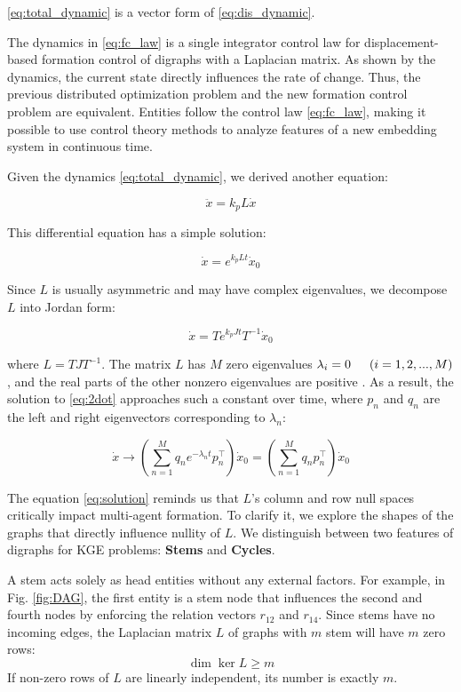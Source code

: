 \documentclass[letterpaper, 10 pt, conference]{ieeeconf}  %
\begin{document}
\noindent \eqref{eq:total_dynamic} is a vector form of \eqref{eq:dis_dynamic}.

The dynamics in \eqref{eq:fc_law} is a single integrator control law for displacement-based formation control of digraphs with a Laplacian matrix. As shown by the dynamics, the current state directly influences the rate of change. Thus, the previous distributed optimization problem and the new formation control problem are equivalent. Entities follow the control law \eqref{eq:fc_law}, making it possible to use control theory methods to analyze features of a new embedding system in continuous time.

Given the dynamics \eqref{eq:total_dynamic}, we derived another equation:

\begin{equation}
    \ddot{x} = k_p L \dot{x}
    \label{eq:2dot}
\end{equation}

\noindent This differential equation has a simple solution:

\[
    \dot{x} = e^{k_p Lt} \dot{x}_0
\]

\noindent Since \( L \) is usually asymmetric and may have complex eigenvalues, we decompose \( L \) into Jordan form:

\[
    \dot{x} = Te^{k_p Jt}T^{-1} \dot{x}_0
\]

\noindent where \( L = TJT^{-1} \). The matrix \( L \) has \(M\) zero eigenvalues \( \lambda_i = 0 \indent (i = 1,2,...,M) \), and the real parts of the other nonzero eigenvalues are positive \cite{mirzaev_laplacian_2013}. As a result, the solution to \eqref{eq:2dot} approaches such a constant over time, where \( p_n \) and \( q_n \) are the left and right eigenvectors corresponding to \( \lambda_n \):

\begin{equation}
    \dot{x} \rightarrow (\sum_{n=1}^M q_n e^{-\lambda_n t}p_n^\top) \dot{x}_0 = (\sum_{n=1}^M q_n p_n^\top )\dot{x}_0
    \label{eq:solution}
\end{equation}

\noindent The equation \eqref{eq:solution} reminds us that $L$'s column and row null spaces critically impact multi-agent formation. 
To clarify it, we explore the shapes of the graphs that directly influence nullity of \( L\). We distinguish between two features of digraphs for KGE problems: \textbf{Stems} and \textbf{Cycles}.

A stem acts solely as head entities without any external factors. For example, in Fig. \ref{fig:DAG}, the first entity is a stem node that influences the second and fourth nodes by enforcing the relation vectors \( r_{12} \) and \( r_{14} \). Since stems have no incoming edges, the Laplacian matrix \( L \) of graphs with \( m \) stem will have \( m \) zero rows:
\[
    \dim \ker L \geq m
\]
If non-zero rows of \(L\) are linearly independent, its number is exactly \(m\). 
\end{document}
